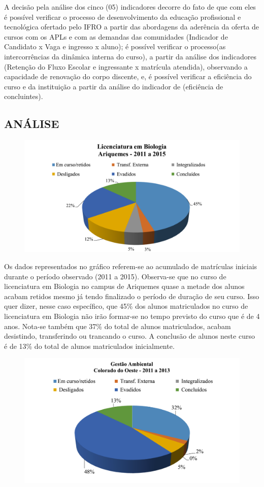 \documentclass[article,12pt,onesidea,4paper,english,brazil]{abntex2}
\begin{document}
	A decisão pela análise dos cinco (05) indicadores decorre do fato de que com eles é possível
	verificar o processo de desenvolvimento da educação profissional e tecnológica ofertado pelo
	IFRO a partir das abordagens da aderência da oferta de cursos com os APLs e com as demandas
	das comunidades (Indicador de Candidato x Vaga e ingresso x aluno); é possível verificar o
	processo(as intercorrências da dinâmica interna do curso), a partir da análise dos indicadores
	(Retenção do Fluxo Escolar e ingressante x matrícula atendida), observando a capacidade de
	renovação do corpo discente, e, é possível verificar a eficiência do curso e da instituição a partir
	da análise do indicador de (eficiência de concluintes).
	
	\subsection*{ANÁLISE}

	\begin{figure}[ht]
		\centering
		\includegraphics[width=.8\linewidth]{pip-97-6}
	\end{figure}
	Os dados representados no gráfico referem-se ao acumulado de matrículas iniciais durante o
	período observado (2011 a 2015).
	Observa-se que no curso de licenciatura em Biologia no campus de Ariquemes quase a
	metade dos alunos acabam retidos mesmo já tendo finalizado o período de duração de seu curso.
	Isso quer dizer, nesse caso específico, que 45\% dos alunos matriculados no curso de licenciatura
	em Biologia não irão formar-se no tempo previsto do curso que é de 4 anos. Nota-se também que 37\% do total de alunos matriculados, acabam desistindo, transferindo ou trancando o curso. A
	conclusão de alunos neste curso é de 13\% do total de alunos matriculados inicialmente.
	
	\begin{figure}[ht]
		\centering
		\includegraphics[width=.8\linewidth]{pip-97-7}
	\end{figure}
\end{document}

